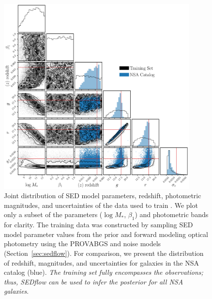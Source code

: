 \begin{figure}
\begin{center}
\includegraphics[width=0.9\textwidth]{figs/training.pdf}
    \caption{\label{fig:data}
    Joint distribution of SED model parameters, redshift, photometric
    magnitudes, and uncertainties of the data used to train \sedflow.
    We plot only a subset of the parameters ($\log M_*$, $\beta_1$) and
    photometric bands for clarity.
    The training data was constructed by sampling SED model parameter values
    from the prior and forward modeling optical photometry using the PROVABGS
    and noise models (Section~\ref{sec:sedflow}). 
    For comparison, we present the distribution of redshift, magnitudes, and
    uncertainties for galaxies in the NSA catalog (blue). 
    \emph{The training set fully encompasses the observations; thus, 
    {\sc SEDflow} can be used to infer the posterior for all NSA galaxies}.
    }
\end{center}
\end{figure}
